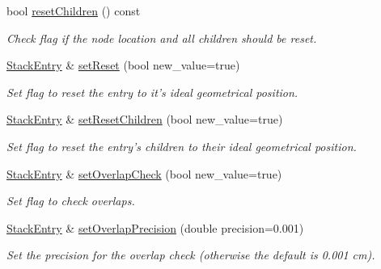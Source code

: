 \begin{DoxyCompactItemize}
bool \hyperlink{struct_d_d4hep_1_1_alignments_1_1_alignment_stack_1_1_stack_entry_a11159bc6f1295a09d09bea74578002e1}{resetChildren} () const 
\begin{DoxyCompactList}\small\item\em Check flag if the node location and all children should be reset. \item\end{DoxyCompactList}\item 
\hyperlink{struct_d_d4hep_1_1_alignments_1_1_alignment_stack_1_1_stack_entry}{StackEntry} \& \hyperlink{struct_d_d4hep_1_1_alignments_1_1_alignment_stack_1_1_stack_entry_acd99f7e6583a0c0b65dff2393eaa670c}{setReset} (bool new\_\-value=true)
\begin{DoxyCompactList}\small\item\em Set flag to reset the entry to it's ideal geometrical position. \item\end{DoxyCompactList}\item 
\hyperlink{struct_d_d4hep_1_1_alignments_1_1_alignment_stack_1_1_stack_entry}{StackEntry} \& \hyperlink{struct_d_d4hep_1_1_alignments_1_1_alignment_stack_1_1_stack_entry_ad594ba553b888a578b961d11db56c3c9}{setResetChildren} (bool new\_\-value=true)
\begin{DoxyCompactList}\small\item\em Set flag to reset the entry's children to their ideal geometrical position. \item\end{DoxyCompactList}\item 
\hyperlink{struct_d_d4hep_1_1_alignments_1_1_alignment_stack_1_1_stack_entry}{StackEntry} \& \hyperlink{struct_d_d4hep_1_1_alignments_1_1_alignment_stack_1_1_stack_entry_aab3b64eec3b308f200667f95d1b60a16}{setOverlapCheck} (bool new\_\-value=true)
\begin{DoxyCompactList}\small\item\em Set flag to check overlaps. \item\end{DoxyCompactList}\item 
\hyperlink{struct_d_d4hep_1_1_alignments_1_1_alignment_stack_1_1_stack_entry}{StackEntry} \& \hyperlink{struct_d_d4hep_1_1_alignments_1_1_alignment_stack_1_1_stack_entry_a0b82028a7597f34015a833c6273bd36b}{setOverlapPrecision} (double precision=0.001)
\begin{DoxyCompactList}\small\item\em Set the precision for the overlap check (otherwise the default is 0.001 cm). \item\end{DoxyCompactList}\end{DoxyCompactItemize}
